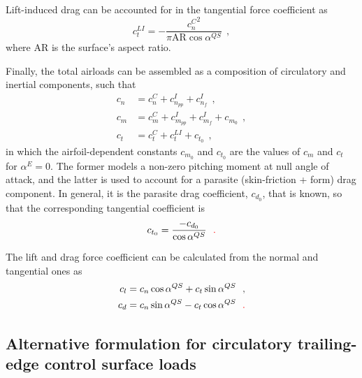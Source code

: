 \documentclass[12pt,a4paper,oneside,english]{abntex2} %
\newcommand{\fix}[1]{{\color{red}#1}}
\begin{document}
Lift-induced drag can be accounted for in the tangential force coefficient as
\begin{equation}
    c_t^{LI} = -\frac{{c_n^C}^2}{\pi \mathrm{AR}\cos{\alpha^{QS}}} \ \ ,    
    \label{eq:ctLI}
\end{equation}
where $\mathrm{AR}$ is the surface's aspect ratio.

Finally, the total airloads can be assembled as a composition of circulatory and inertial components, such that
\begin{align}
    c_n &= c_n^C + c_{n_{pp}}^I + c_{n_f}^I \ \ ,
    \label{eq:cn_attached}
    \\
    c_m &=  c_m^C + c_{m_{pp}}^I + c_{m_f}^I + c_{m_0} \ \ ,
    \label{eq:cm_attached}
    \\
    c_t &= c_t^C + c_t^{LI} + c_{t_0} \ \ ,
    \label{eq:ct_attached}
\end{align}
in which the airfoil-dependent constants $c_{m_0}$ and $c_{t_0}$ \fix{are} the values of $c_m$ and $c_t$ for $\alpha^E=0$. The former models a non-zero pitching moment at null angle of attack, and the latter is used to account for a parasite (skin-friction + form) drag component. In general, it is the parasite drag coefficient, $c_{d_0}$, that is known, so that the corresponding tangential coefficient is
\begin{equation}
    c_{t_0} = \frac{-c_{d_0}}{\cos\alpha^{QS}} \ \ \fix{.}
    \label{eq:ct0}
\end{equation}

The lift and drag force coefficient can be calculated from the normal and tangential ones as
\begin{align}
    c_l &= c_n\cos{\alpha^{QS}} + c_t\sin{\alpha^{QS}} \ \ ,
    \label{eq:cl_attached}
    \\
    c_d &= c_n\sin{\alpha^{QS}} - c_t\cos{\alpha^{QS}} \ \ \fix{.}
    \label{eq:cd_attached}
\end{align}

\subsection{Alternative formulation for circulatory trailing-edge control surface loads}
\label{subsec:adhoc_flap_loads}
\end{document}
